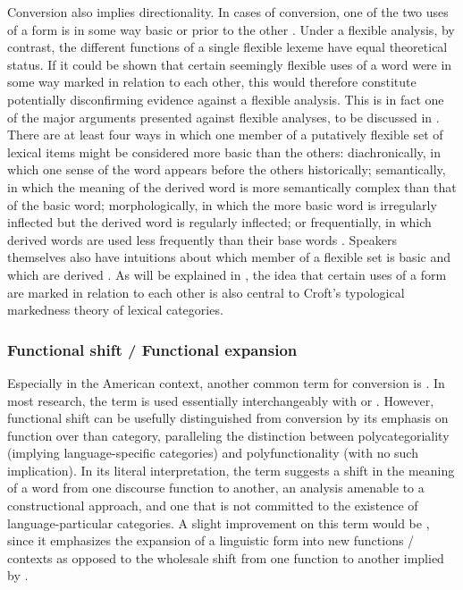 Conversion also implies directionality. In cases of conversion, one of the two uses of a form is in some way basic or prior to the other \parencites[156]{Mithun2017}[5]{VapnarksyVeneziano2017}. Under a flexible analysis, by contrast, the different functions of a single flexible lexeme have equal theoretical status. If it could be shown that certain seemingly flexible uses of a word were in some way marked in relation to each other, this would therefore constitute potentially disconfirming evidence against a flexible analysis. This is in fact one of the major arguments presented against flexible analyses, to be discussed in . There are at least four ways in which one member of a putatively flexible set of lexical items might be considered more basic than the others: diachronically, in which one sense of the word appears before the others historically; semantically, in which the meaning of the derived word is more semantically complex than that of the basic word; morphologically, in which the more basic word is irregularly inflected but the derived word is regularly inflected; or frequentially, in which derived words are used less frequently than their base words \parencite[108--111]{Plag2003}. Speakers themselves also have intuitions about which member of a flexible set is basic and which are derived \parencite[166]{Mithun2017}. As will be explained in , the idea that certain uses of a form are marked in relation to each other is also central to Croft's typological markedness theory of lexical categories.

\subsubsection{Functional shift / Functional expansion}
\label{sec:2.3.1.8}

Especially in the American context, another common term for conversion is  \parencite{Cannon1985}. In most research, the term is used essentially interchangeably with  or . However, functional shift can be usefully distinguished from conversion by its emphasis on function over than category, paralleling the distinction between polycategoriality (implying language-specific categories) and polyfunctionality (with no such implication). In its literal interpretation, the term suggests a shift in the meaning of a word from one discourse function to another, an analysis amenable to a constructional approach, and one that is not committed to the existence of language-particular categories. A slight improvement on this term would be , since it emphasizes the expansion of a linguistic form into new functions / contexts as opposed to the wholesale shift from one function to another implied by .

